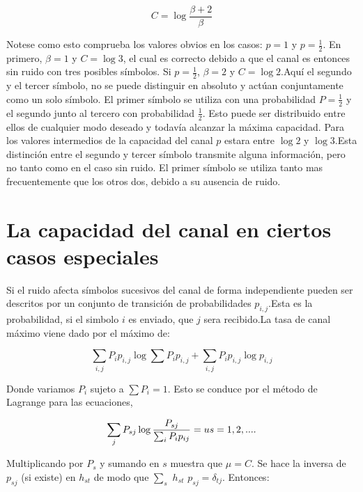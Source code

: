 \begin{equation}
  C = \log{\frac{\beta + 2}{\beta}}
\end{equation}

Notese como esto comprueba los valores obvios en los casos: $p = 1$ y $p = \frac{1}{2}$. En primero, $\beta = 1$ y $C = \log{3}$, 
el cual es correcto debido a que el canal es entonces sin ruido con tres posibles s\'imbolos. Si $p = \frac{1}{2}$, $\beta = 2$ y 
$C = \log{2}$.Aqu\'i el segundo y el tercer s\'imbolo, no se puede distinguir en absoluto y act\'uan conjuntamente como un solo 
s\'imbolo. El primer s\'imbolo se utiliza con una probabilidad $P = \frac{1}{2}$  y el segundo junto al tercero con probabilidad $\frac{1}{2}$. Esto puede ser distribuido entre ellos de cualquier modo deseado y todav\'ia alcanzar la m\'axima capacidad.
Para los valores intermedios de la capacidad del canal $p$ estara entre $\log{2}$ y $\log{3}$.Esta distinci\'on 
entre el segundo y tercer s\'imbolo transmite alguna informaci\'on, pero no tanto como en el caso sin ruido.
El primer s\'imbolo se utiliza tanto mas frecuentemente que los otros dos, debido a su ausencia de ruido.

\clearpage

\chapter{La capacidad del canal en ciertos casos especiales}
\label{sec:16}

Si el ruido afecta s\'imbolos sucesivos del canal de forma independiente pueden ser descritos por un conjunto de 
transici\'on de probabilidades $p_{i,j}$.Esta es la probabilidad, si el simbolo $i$ es
enviado, que $j$ sera recibido.La tasa de canal m\'aximo viene dado por el m\'aximo de:

\begin{equation}
  \sum_{i,j}P_i p_{i,j} \log{\sum{P_i p_{i,j}}} + \sum_{i,j}P_i p_{i,j}\log{p_{i,j}}
\end{equation}
 
Donde variamos $P_i$ sujeto a $ \sum P_i = 1$. Esto se conduce por el m\'etodo de Lagrange para las ecuaciones,

\begin{equation}
\sum_{j}P_{sj} \log{\frac{P_{sj}}{\sum_{i} P_i p_{ij} }} = u \\
s = 1,2,....
\end{equation}

Multiplicando por $P_s$ y sumando en $s$ muestra que $\mu = C$. Se hace la inversa de $p_{sj}$ (si existe) en $h_{st}$  de modo que 
$\sum_{s}$ $h_{st}$ $p_{sj} = \delta_{tj}$. Entonces: 

